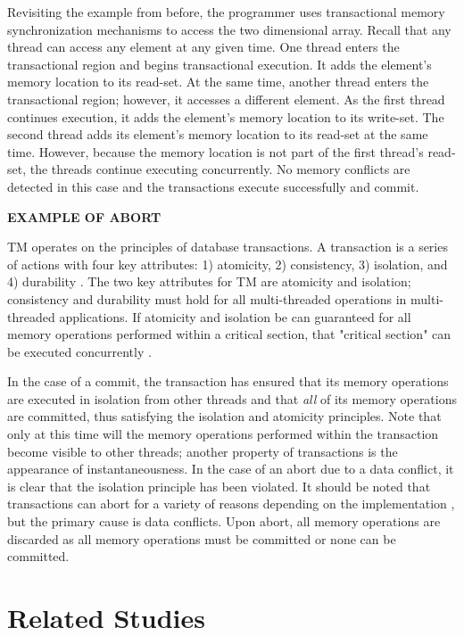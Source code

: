 \documentclass[11pt]{book}
\begin{document}
Revisiting the example from before, the programmer uses transactional memory
synchronization mechanisms to access the two dimensional array.  Recall that any thread
can access any element at any given time.  One thread enters the transactional region and
begins transactional execution.  It adds the element's memory location to its read-set.
At the same time, another thread enters the transactional region; however, it accesses a
different element.  As the first thread continues execution, it adds the element's memory
location to its write-set.  The second thread adds its element's memory location to its
read-set at the same time.  However, because the memory location is not part of the first
thread's read-set, the threads continue executing concurrently.  No memory conflicts are
detected in this case and the transactions execute successfully and commit.

\textbf{EXAMPLE OF ABORT}

TM operates on the principles of database transactions.  A transaction is a series of
actions with four key attributes: 1) atomicity, 2) consistency, 3) isolation, and 4)
durability \cite{tm_2nd}.  The two key attributes for TM are atomicity and isolation;
consistency and durability must hold for all multi-threaded operations in multi-threaded
applications.  If atomicity and isolation be can guaranteed for all memory operations
performed within a critical section, that "critical section" can be executed concurrently
\cite{sle_rajwar}.

In the case of a commit, the transaction has ensured that its memory operations are
executed in isolation from other threads and that \emph{all} of its memory operations
are committed, thus satisfying the isolation and atomicity principles.  Note that only at
this time will the memory operations performed within the transaction become visible to
other threads; another property of transactions is the appearance of instantaneousness.
In the case of an abort due to a data conflict, it is clear that the isolation principle
has been violated.  It should be noted that transactions can abort for a variety of
reasons depending on the implementation \cite{intel_opt_man,chung_amd}, but the primary
cause is data conflicts.  Upon abort, all memory operations are discarded as all memory
operations must be committed or none can be committed.

\section{Related Studies}
\end{document}
